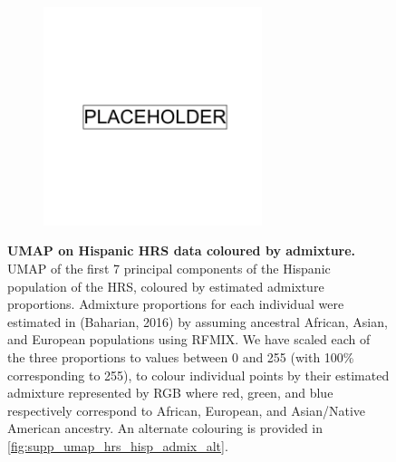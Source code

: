 \begin{figure}
    \centering
    \begin{subfigure}{\textwidth}
    \includegraphics[width=0.7\textwidth]{placeholder.png}
    \end{subfigure}
    \caption[UMAP on Hispanic HRS data coloured by admixture]{\textbf{UMAP on Hispanic HRS data coloured by admixture.} UMAP of the first 7 principal components of the Hispanic population of the HRS, coloured by estimated admixture proportions. Admixture proportions for each individual were estimated in (Baharian, 2016) by assuming ancestral African, Asian, and European populations using RFMIX. We have scaled each of the three proportions to values between 0 and 255 (with 100\% corresponding to 255), to colour individual points by their estimated admixture represented by RGB where red, green, and blue respectively correspond to African, European, and Asian/Native American ancestry. An alternate colouring is provided in \ref{fig:supp_umap_hrs_hisp_admix_alt}.}
    \label{fig:supp_umap_hrs_hisp_admix}
\end{figure}

\newpage

